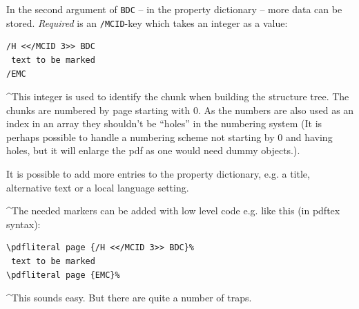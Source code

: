 \documentclass[DIV=12,parskip=half-,bibliography=totoc]{scrartcl}
\begin{document}
\begin{description}
\TagP In the second argument of \texttt{BDC} -- in the property dictionary -- more data can be stored. \emph{Required} is an \texttt{/MCID}-key which takes an integer as a value:\TagPend

\begin{lstlisting}
/H <</MCID 3>> BDC
 text to be marked
/EMC
\end{lstlisting}
\tagmcend\tagstructend

\TagP^This integer is used to identify the chunk when building the structure tree. The chunks are numbered by page starting with 0. As the numbers are also used as an index in an array they shouldn't be \enquote{holes} in the numbering system
(It is perhaps possible to handle a numbering scheme not starting by 0 and having holes, but it will enlarge the pdf as one would need dummy objects.).

\TagP It is possible to add more entries to the property dictionary, e.g. a title, alternative text or a local language setting.\Pmeti
\end{description}


\TagP^The needed markers can be added with low level code e.g. like this (in pdftex syntax):\TagPend

\begin{lstlisting}
\pdfliteral page {/H <</MCID 3>> BDC}%
 text to be marked
\pdfliteral page {EMC}%
\end{lstlisting}
\tagmcend\tagstructend

\TagP^This sounds easy. But there are quite a number of traps.\TagPend
\end{document}
